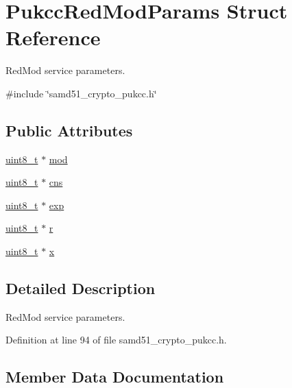\hypertarget{structPukccRedModParams}{}\section{Pukcc\+Red\+Mod\+Params Struct Reference}
\label{structPukccRedModParams}


Red\+Mod service parameters.  




{\ttfamily \#include \char`\"{}samd51\+\_\+crypto\+\_\+pukcc.\+h\char`\"{}}

\subsection*{Public Attributes}
\begin{DoxyCompactItemize}
\item 
\hyperlink{stdint_8h_aba7bc1797add20fe3efdf37ced1182c5}{uint8\+\_\+t} $\ast$ \hyperlink{structPukccRedModParams_af09d279077a4542a83ea1a1712c83cc1}{mod}
\item 
\hyperlink{stdint_8h_aba7bc1797add20fe3efdf37ced1182c5}{uint8\+\_\+t} $\ast$ \hyperlink{structPukccRedModParams_af77a83935bf3590641efc9bea0e92c3c}{cns}
\item 
\hyperlink{stdint_8h_aba7bc1797add20fe3efdf37ced1182c5}{uint8\+\_\+t} $\ast$ \hyperlink{structPukccRedModParams_a63087de1b5936442aaeb0f4f0414429b}{exp}
\item 
\hyperlink{stdint_8h_aba7bc1797add20fe3efdf37ced1182c5}{uint8\+\_\+t} $\ast$ \hyperlink{structPukccRedModParams_ad190b2cdf469a2c0effcbab941c4f844}{r}
\item 
\hyperlink{stdint_8h_aba7bc1797add20fe3efdf37ced1182c5}{uint8\+\_\+t} $\ast$ \hyperlink{structPukccRedModParams_af12974e9d34a4ccc9b3e2e71d87a9db0}{x}
\end{DoxyCompactItemize}


\subsection{Detailed Description}
Red\+Mod service parameters. 

Definition at line 94 of file samd51\+\_\+crypto\+\_\+pukcc.\+h.



\subsection{Member Data Documentation}
\mbox{\label{structPukccRedModParams_af77a83935bf3590641efc9bea0e92c3c}} 
